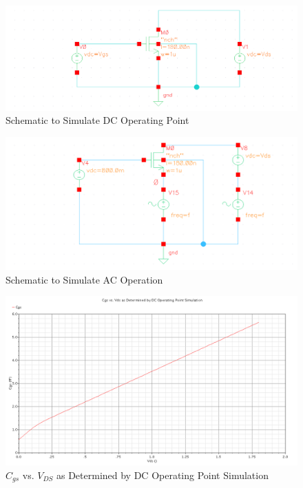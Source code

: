 \documentclass{article}
\begin{document}
\begin{figure}[H]
\centering
\includegraphics[width=6in]{1_dc_schematic.png}
\caption{Schematic to Simulate DC Operating Point}
\label{1_dc_schem}
\end{figure}

\begin{figure}[H]
\centering
\includegraphics[width=6in]{1_ac_schematic.png}
\caption{Schematic to Simulate AC Operation}
\label{1_ac_schem}
\end{figure}

\begin{figure}[H]
\centering
\includegraphics[width=5in]{1a.png}
\caption{$C_{gs}$ vs. $V_{DS}$ as Determined by DC Operating Point Simulation}
\label{1a}
\end{figure}
\end{document}
